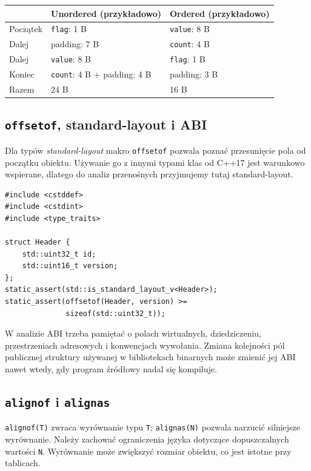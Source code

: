 \begin{center}
\small
\begin{tabular}{|l|p{4.4cm}|p{4.4cm}|}
\hline
 & \textbf{Unordered (przykładowo)} & \textbf{Ordered (przykładowo)} \\
\hline
Początek & \texttt{flag}: 1 B & \texttt{value}: 8 B \\
\hline
Dalej & padding: 7 B & \texttt{count}: 4 B \\
\hline
Dalej & \texttt{value}: 8 B & \texttt{flag}: 1 B \\
\hline
Koniec & \texttt{count}: 4 B + padding: 4 B & padding: 3 B \\
\hline
Razem & 24 B & 16 B \\
\hline
\end{tabular}
\end{center}

\subsection{\texttt{offsetof}, standard-layout i ABI}

Dla typów \emph{standard-layout} makro \texttt{offsetof} pozwala
poznać przesunięcie pola od początku obiektu. Używanie go z innymi
typami klas od C++17 jest warunkowo wspierane, dlatego do analiz
przenośnych przyjmujemy tutaj standard-layout.

\begin{lstlisting}
#include <cstddef>
#include <cstdint>
#include <type_traits>

struct Header {
    std::uint32_t id;
    std::uint16_t version;
};
static_assert(std::is_standard_layout_v<Header>);
static_assert(offsetof(Header, version) >=
              sizeof(std::uint32_t));
\end{lstlisting}

W analizie ABI trzeba pamiętać o polach wirtualnych, dziedziczeniu,
przestrzeniach adresowych i konwencjach wywołania. Zmiana kolejności
pól publicznej struktury używanej w bibliotekach binarnych może
zmienić jej ABI nawet wtedy, gdy program źródłowy nadal się kompiluje.

\subsection{\texttt{alignof} i \texttt{alignas}}

\texttt{alignof(T)} zwraca wyrównanie typu \texttt{T};
\texttt{alignas(N)} pozwala narzucić silniejsze wyrównanie.
Należy zachować ograniczenia języka dotyczące dopuszczalnych wartości
\texttt{N}. Wyrównanie może zwiększyć rozmiar obiektu, co jest
istotne przy tablicach.

